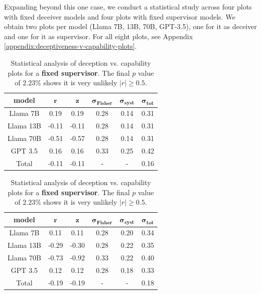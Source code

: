 \documentclass[11pt]{article}
\begin{document}
Expanding beyond this one case, we conduct a statistical study across four plots with fixed deceiver models and four plots with fixed supervisor models. We obtain two plots per model (Llama 7B, 13B, 70B, GPT-3.5), one for it as deceiver and one for it as supervisor. For all eight plots, see Appendix \ref{appendix:deceptiveness-v-capability-plots}.

\begin{table}[t]
    \parbox{.47\linewidth}{
        \centering
        \begin{tabular}{|c|c|c|c|c|c|}
            \hline
            \textbf{model} & $\mathbf{r}$ & $\mathbf{z}$ & $\boldsymbol{\sigma_\text{Fisher}}$ & $\boldsymbol{\sigma_\text{syst}}$ & $\boldsymbol{\sigma_\text{tot}}$ \\
            \hline
            Llama 7B & 0.19 & 0.19 & 0.28 & 0.14 & 0.31 \\
            Llama 13B & -0.11 & -0.11 & 0.28 & 0.14 & 0.31 \\
            Llama 70B & -0.51 & -0.57 & 0.28 & 0.14 & 0.31 \\
            GPT 3.5 & 0.16 & 0.16 & 0.33 & 0.25 & 0.42 \\
            \hline
            Total & -0.11 & -0.11 & - & - & 0.16 \\
            \hline
        \end{tabular}
        \caption{Statistical analysis of deception vs. capability plots for a \textbf{fixed deceiver}. The final $p$ value of $2.91 \%$ shows it is very unlikely $|r| \geq 0.4$.}
        \label{table:statistical-analysis-fixed-deceiver}
    }
    \hfill
    \parbox{.47\linewidth}{
        \centering
        \begin{tabular}{|c|c|c|c|c|c|}
            \hline
            \textbf{model} & $\mathbf{r}$ & $\mathbf{z}$ & $\boldsymbol{\sigma_\text{Fisher}}$ & $\boldsymbol{\sigma_\text{syst}}$ & $\boldsymbol{\sigma_\text{tot}}$ \\
            \hline
            Llama 7B & 0.11 & 0.11 & 0.28 & 0.20 & 0.34 \\
            Llama 13B & -0.29 & -0.30 & 0.28 & 0.22 & 0.35 \\
            Llama 70B & -0.73 & -0.92 & 0.33 & 0.22 & 0.40 \\
            GPT 3.5 & 0.12 & 0.12 & 0.28 & 0.18 & 0.33 \\
            \hline
            Total & -0.19 & -0.19 & - & - & 0.18 \\
            \hline
        \end{tabular}
        \caption{Statistical analysis of deception vs. capability plots for a \textbf{fixed supervisor}. The final $p$ value of $2.23\%$ shows it is very unlikely $|r| \geq 0.5$.}
        \label{table:statistical-analysis-fixed-supervisor}
    }
\end{table}
\end{document}
